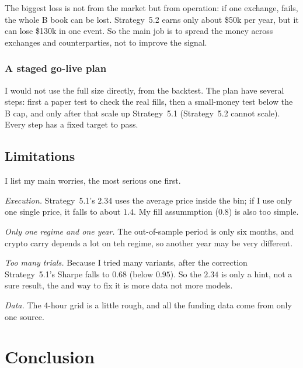 \documentclass[10pt,twocolumn,a4paper]{article}
\begin{document}
The biggest loss is not from the market but from operation: if one exchange, fails,
the whole B book can be lost.  Strategy~5.2 earns only about \$50k per year, but it can
lose \$130k in one event.  So the main job is to spread the money across exchanges
and counterparties, not to improve the signal.

\subsubsection{A staged go-live plan}

I would not use the full size directly, from the backtest.  The plan have several
steps: first a paper test to check the real fills, then a small-money test below the
B cap, and only after that scale up Strategy~5.1 (Strategy~5.2 cannot scale).  Every step
has a fixed target to pass.


\subsection{Limitations}
\label{sec:limits}

I list my main worries, the most serious one first.

\emph{Execution.}  Strategy~5.1's $2.34$ uses the average price inside the bin; if I
use only one single price, it falls to about $1.4$.  My fill assummption ($0.8$) is
also too simple.

\emph{Only one regime and one year.}  The out-of-sample period is only six months,
and crypto carry depends a lot on teh regime, so another year may be very different.

\emph{Too many trials.}  Because I tried many variants, after the correction
Strategy~5.1's Sharpe falls to $0.68$ (below $0.95$).  So the $2.34$ is only a hint,
not a sure result, the and way to fix it is more data not more models.

\emph{Data.}  The 4-hour grid is a little rough, and all the funding data come from
only one source.




\balance
\clearpage
\section{Conclusion}
\label{sec:conclusion}
\end{document}
